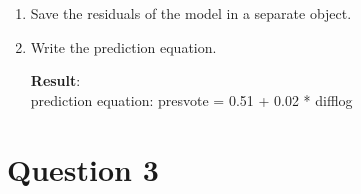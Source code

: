 \documentclass[12pt,letterpaper]{article}
\begin{document}
\begin{enumerate}
			\vspace{.25cm}
		\item Save the residuals of the model in a separate object.	
			 
		\item Write the prediction equation.
			 
			\textbf{Result}:\\
			prediction equation: presvote = 0.51 + 0.02 * difflog

	\end{enumerate}
	
	\newpage	
\section*{Question 3}
\end{document}
